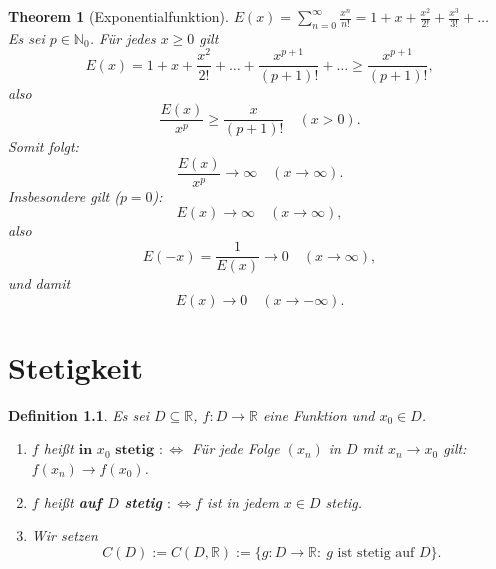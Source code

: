 \documentclass[12pt]{extreport} %
\newcommand{\N}{\mathbb{N}}
\newcommand{\R}{\mathbb{R}}
\theoremstyle{named}
\newtheorem{unnamedtheorem}{Theorem} \counterwithin{unnamedtheorem}{chapter}
\theoremstyle{itshape}
\newtheorem*{definition}{Definition}
\theoremstyle{normal}
\begin{document}
\begin{unnamedtheorem}[Exponentialfunktion] \label{6.4:prop-Exponentialfunktion}
	$E(x) = \sum_{n=0}^{\infty} \frac{x^{n}}{n!} = 1 + x + \frac{x^{2}}{2!} + \frac{x^{3}}{3!} + \dotsc$ \\
	Es sei $p \in \N_{0}$. Für jedes $x \geq 0$ gilt
		$$ E(x) = 1 + x + \frac{x^{2}}{2!} + \dotsc + \frac{x^{p+1}}{(p+1)!} + \dotsc \geq \frac{x^{p+1}}{(p+1)!}, $$
		also $$\frac{E(x)}{x^{p}} \geq \frac{x}{(p+1)!} \quad (x>0). $$
	Somit folgt:
		$$ \frac{E(x)}{x^{p}} \rightarrow \infty \quad (x \rightarrow \infty). $$
	Insbesondere gilt ($p = 0$): 
	$$
	E(x) \rightarrow \infty \quad (x \rightarrow \infty),
	$$
	also
	$$ E(-x) = \frac{1}{E(x)} \rightarrow 0 \quad (x \rightarrow \infty),$$
	und damit
	$$E(x) \rightarrow  0 \quad (x \rightarrow -\infty).$$
\end{unnamedtheorem}


\newpage


\chapter{Stetigkeit}

\begin{definition}
	Es sei $D \subseteq \R$, $f \colon D \rightarrow \R$ eine Funktion und $x_{0} \in D$. 
	\begin{enumerate}
		\item $f$ hei{\ss}t $\textbf{in }  x_{0} \textbf{ stetig}$ $:\iff$ Für jede Folge $(x_{n})$ in $D$ mit $x_{n} \rightarrow x_{0}$ gilt: 
		$f(x_{n}) \rightarrow f(x_{0})$.
		\item $f$ hei{\ss}t \textbf{auf $D$ stetig} $:\iff f$ ist in jedem $x \in D$ stetig.
		\item Wir setzen
		$$
		C(D):=C(D,\R):= \{g:D \to \R: ~ g \text{ ist stetig auf } D \}.
		$$
	\end{enumerate}
\end{definition}
\end{document}
